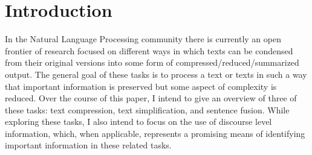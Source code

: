 \section{Introduction}



{In the Natural Language Processing community there is currently an open frontier of research focused on different ways in which texts can be condensed from their original versions into some form of compressed/reduced/summarized output. The general goal of these tasks is to process a text or texts in such a way that important information is preserved but some aspect of complexity is reduced.  Over the course of this paper, I intend to give an overview of three of these tasks: text compression, text simplification, and sentence fusion. While exploring these tasks, I also intend to focus on the use of discourse level information, which, when applicable, represents a promising means of identifying important information in these related tasks.}

